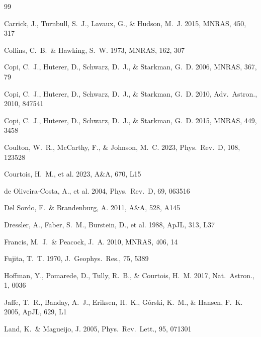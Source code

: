 \documentclass[12pt]{article}
\begin{document}
\begin{thebibliography}{99}

Carrick, J., Turnbull, S.~J., Lavaux, G., \& Hudson, M.~J. 2015, MNRAS, 450, 317

Collins, C.~B.\ \& Hawking, S.~W. 1973, MNRAS, 162, 307

Copi, C.~J., Huterer, D., Schwarz, D.~J., \& Starkman, G.~D. 2006, MNRAS, 367, 79

Copi, C.~J., Huterer, D., Schwarz, D.~J., \& Starkman, G.~D. 2010, Adv.\ Astron., 2010, 847541

Copi, C.~J., Huterer, D., Schwarz, D.~J., \& Starkman, G.~D. 2015, MNRAS, 449, 3458

Coulton, W.~R., McCarthy, F., \& Johnson, M.~C. 2023, Phys.\ Rev.\ D, 108, 123528

Courtois, H.~M., et al. 2023, A\&A, 670, L15

de Oliveira-Costa, A., et al. 2004, Phys.\ Rev.\ D, 69, 063516

Del Sordo, F.\ \& Brandenburg, A. 2011, A\&A, 528, A145

Dressler, A., Faber, S.~M., Burstein, D., et al. 1988, ApJL, 313, L37

Francis, M.~J.\ \& Peacock, J.~A. 2010, MNRAS, 406, 14

Fujita, T.~T. 1970, J.\ Geophys.\ Res., 75, 5389

Hoffman, Y., Pomarede, D., Tully, R.~B., \& Courtois, H.~M. 2017, Nat.\ Astron., 1, 0036

Jaffe, T.~R., Banday, A.~J., Eriksen, H.~K., G\'{o}rski, K.~M., \& Hansen, F.~K. 2005, ApJL, 629, L1

Land, K.\ \& Magueijo, J. 2005, Phys.\ Rev.\ Lett., 95, 071301


\end{thebibliography}
\end{document}
